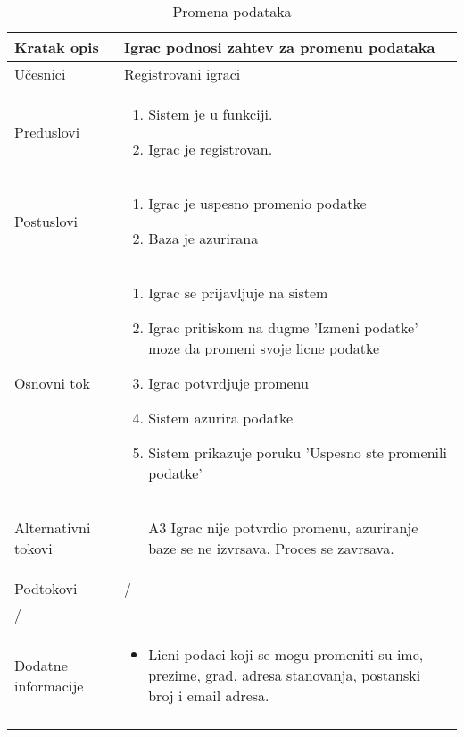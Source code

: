 \documentclass{article}
\begin{document}
\begin{longtable}{| p{} | p{} |} 
\hline
    Kratak opis & Igrac podnosi zahtev za promenu podataka\\ 
\hline    
    Učesnici & Registrovani igraci
    \\
\hline
   Preduslovi & \begin{enumerate}
       \item Sistem je u funkciji.
       \item Igrac je registrovan.
   \end{enumerate}\\
\hline  
    Postuslovi & \begin{enumerate}
        \item Igrac je uspesno promenio podatke
        \item Baza je azurirana
    \end{enumerate}\\
\hline
    Osnovni tok & \begin{enumerate}
        \item Igrac se prijavljuje na sistem
        \item Igrac pritiskom na dugme 'Izmeni podatke' moze da promeni svoje licne podatke
        \item Igrac potvrdjuje promenu
        \item Sistem azurira podatke
        \item Sistem prikazuje poruku 'Uspesno ste promenili podatke'
    \end{enumerate}\\
\hline
    Alternativni tokovi & \begin{itemize}
        \item[A3] Igrac nije potvrdio promenu, azuriranje baze se ne izvrsava. Proces se zavrsava.
    \end{itemize}\\
\hline
    Podtokovi & /\\
\hline
    /\\
\hline
    Dodatne informacije & \begin{itemize}
        \item Licni podaci koji se mogu promeniti su ime, prezime, grad, adresa stanovanja, postanski broj i email adresa.
    \end{itemize} \\
\hline
\caption{Promena podataka} %
\end{longtable}


\end{document}
